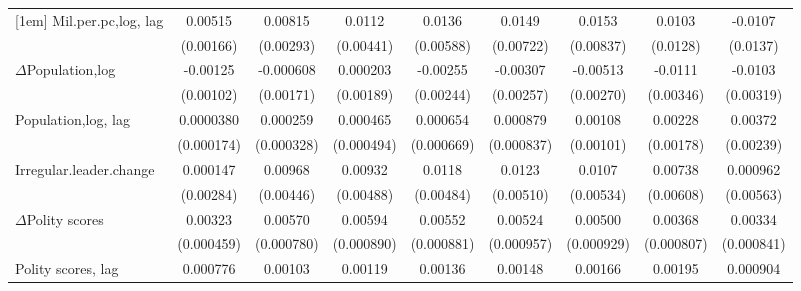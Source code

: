 \begin{table}[htbp]
\begin{tabular}{l*{8}{c}}
[1em]
Mil.per.pc,log, lag     &     0.00515\sym{***}&     0.00815\sym{***}&      0.0112\sym{**} &      0.0136\sym{**} &      0.0149\sym{**} &      0.0153\sym{*}  &      0.0103         &     -0.0107         \\
                    &   (0.00166)         &   (0.00293)         &   (0.00441)         &   (0.00588)         &   (0.00722)         &   (0.00837)         &    (0.0128)         &    (0.0137)         \\
[1em]
$\Delta$Population,log             &    -0.00125         &   -0.000608         &    0.000203         &    -0.00255         &    -0.00307         &    -0.00513\sym{*}  &     -0.0111\sym{***}&     -0.0103\sym{***}\\
                    &   (0.00102)         &   (0.00171)         &   (0.00189)         &   (0.00244)         &   (0.00257)         &   (0.00270)         &   (0.00346)         &   (0.00319)         \\
[1em]
Population,log, lag               &   0.0000380         &    0.000259         &    0.000465         &    0.000654         &    0.000879         &     0.00108         &     0.00228         &     0.00372         \\
                    &  (0.000174)         &  (0.000328)         &  (0.000494)         &  (0.000669)         &  (0.000837)         &   (0.00101)         &   (0.00178)         &   (0.00239)         \\
[1em]
Irregular.leader.change    &    0.000147         &     0.00968\sym{**} &     0.00932\sym{*}  &      0.0118\sym{**} &      0.0123\sym{**} &      0.0107\sym{**} &     0.00738         &    0.000962         \\
                    &   (0.00284)         &   (0.00446)         &   (0.00488)         &   (0.00484)         &   (0.00510)         &   (0.00534)         &   (0.00608)         &   (0.00563)         \\
[1em]
$\Delta$Polity scores            &     0.00323\sym{***}&     0.00570\sym{***}&     0.00594\sym{***}&     0.00552\sym{***}&     0.00524\sym{***}&     0.00500\sym{***}&     0.00368\sym{***}&     0.00334\sym{***}\\
                    &  (0.000459)         &  (0.000780)         &  (0.000890)         &  (0.000881)         &  (0.000957)         &  (0.000929)         &  (0.000807)         &  (0.000841)         \\
[1em]
Polity scores, lag            &    0.000776\sym{***}&     0.00103\sym{***}&     0.00119\sym{***}&     0.00136\sym{***}&     0.00148\sym{***}&     0.00166\sym{***}&     0.00195\sym{**} &    0.000904         \\

\end{tabular}
\end{table}
